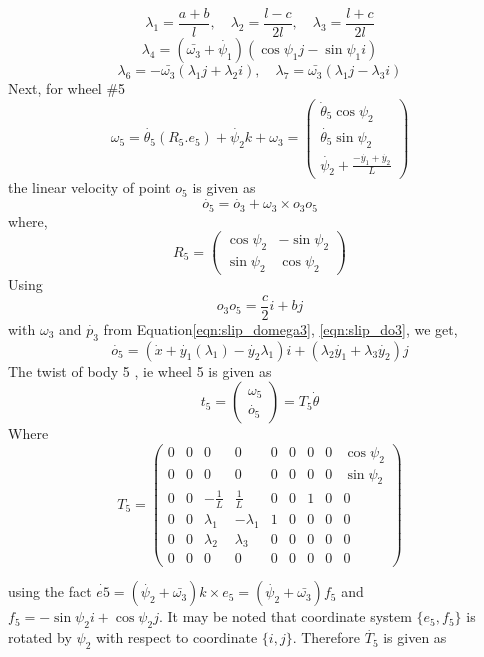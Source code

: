 { \[\lambda_1=\frac{a+b}{l}, \quad \lambda_2=\frac{l-c}{2l}, \quad \lambda_3=\frac{l+c}{2l} \]
  \[\lambda_4=(\bar{\omega_3}+\dot{\psi_1}) (\cos\psi_1 j-\sin \psi_1 i) \]
  \[\lambda_6=-\bar{\omega_3}(\lambda_1 j+\lambda_2 i), \quad \lambda_7=\bar{\omega_3}(\lambda_1 j-\lambda_3 i)\]
Next, for wheel \#5 
\[\omega_5 = \dot{\theta_5} (R_5.e_5) + \dot{\psi_2} k + \omega_3 =
  \left(
\begin{array}{c}
\dot{\theta }_5 \cos \psi_2 \\
\dot{\theta_5} \sin \psi_2 \\
\dot{\psi_2}+\frac{-\dot{y_1}+\dot{y_2}}{L}
\end{array}
\right) \]
the linear velocity of point $o_5$ is given as 
\[ \dot{o_5}=\dot{o_3}+\omega_3 \times o_3o_5\]
where, \begin{equation}
\label{eqn:slipR5}
R_5=\begin{pmatrix}
\cos \psi_2 & - \sin \psi_2\\
\sin \psi_2 & \cos\psi_2
\end{pmatrix}
\end{equation}
Using  \[ o_3o_5=\frac{c}{2}i+bj\] with $\omega_3$ and $\dot{p_3}$ from Equation\ref{eqn:slip_domega3}, \ref{eqn:slip_do3}, we get,
\[\dot{o_5}= \left( \dot{x}+\dot{y_1}(\lambda_1)-\dot{y_2}\lambda_1 \right)i +\left( \lambda_2\dot{y_1}+\lambda_3\dot{y_2}\right)j  \]
The twist of body 5 , ie wheel 5 is given as 
\begin{equation}
\label{eqn:slip_t5}
t_5=
\begin{pmatrix}
\omega_5\\
\dot{o_5}
\end{pmatrix}=T_5 \dot{\theta}
\end{equation}
Where
\begin{equation}
\label{eqn:slip_T5}
T_5=\left(
\begin{array}{ccccccccc}
0 & 0 & 0 & 0 & 0 & 0 & 0 & 0 & \cos \psi_2\\
0 & 0 & 0 & 0 & 0 & 0 & 0 & 0 & \sin\psi_2 \\
0 & 0 & -\frac{1}{L} & \frac{1}{L} & 0 & 0 & 1 & 0 & 0 \\
0 & 0 & \lambda_1 & -\lambda_1 & 1 & 0 & 0 & 0 & 0 \\
0 & 0 &\lambda_2& \lambda_3 & 0 & 0 & 0 & 0 & 0 \\
0 & 0 & 0 & 0 & 0 & 0 & 0 & 0 & 0
\end{array}
\right)
\end{equation}

using the fact $\dot{e5}=(\dot{\psi_2}+\bar{\omega_3})k\times e_5 =(\dot{\psi_2}+\bar{\omega_3})f_5$ and $f_5=-\sin \psi_2 i+\cos \psi_2 j$. It may be noted that coordinate system $\{e_5,f_5\}$ is rotated by $\psi_2$ with respect to coordinate $ \{i,j\}$. Therefore $\dot{T_5}$ is given as

}
